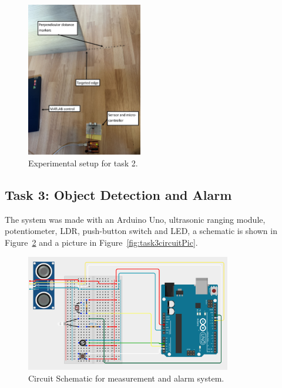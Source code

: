 \documentclass[a4paper,12pt]{article}
\begin{document}
\begin{figure}[htbp]
    \centering
    \includegraphics[width=0.45\textwidth]{figs/page02.jpg}
    \caption{Experimental setup for task 2.}
    \label{fig:setup2}
\end{figure}

\break

\subsection{Task 3: Object Detection and Alarm}
The system was made with an Arduino Uno, ultrasonic ranging module, potentiometer, LDR, push-button switch and LED, a schematic is shown in Figure~\ref{fig:task3circuitSchem} and a picture in Figure~\ref{fig:task3circuitPic}.

\begin{figure}[htbp]
    \centering
    \includegraphics[width=0.8\textwidth]{figs/task3Circuit.png}
    \caption{Circuit Schematic for measurement and alarm system.}
    \label{fig:task3circuitSchem}
\end{figure}
\end{document}
